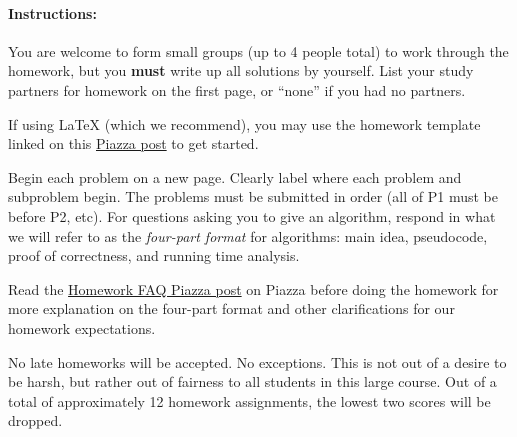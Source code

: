 \documentclass[11pt]{article}
\begin{document}
\maketitle

\paragraph*{Instructions:}

You are welcome to form small groups (up to 4 people total) to work through the homework, but you {\bf must} write up all solutions by yourself. List your study partners for homework on the first page, or ``none'' if you had no partners.

If using LaTeX (which we recommend), you may use the homework template linked on this \href{https://piazza.com/class/j5vqc3j229b6u7?cid=21}{Piazza post} to get started. 

Begin each problem on a new page. Clearly label where each problem and subproblem begin. The problems must be submitted in order (all of P1 must be before P2, etc). For questions asking you to give an algorithm, respond in what we will refer to as the \textit{four-part format} for algorithms: main idea, pseudocode, proof of correctness, and running time analysis.

Read the \href{https://piazza.com/class/j5vqc3j229b6u7?cid=72}{Homework FAQ Piazza post} on Piazza before doing the homework for more explanation on the four-part format and other clarifications for our homework expectations.

No late homeworks will be accepted. No exceptions. This is not out of a desire to be harsh, but rather out of fairness to all students in this large course. Out of a total of approximately 12 homework assignments, the lowest two scores will be dropped.
\end{document}
